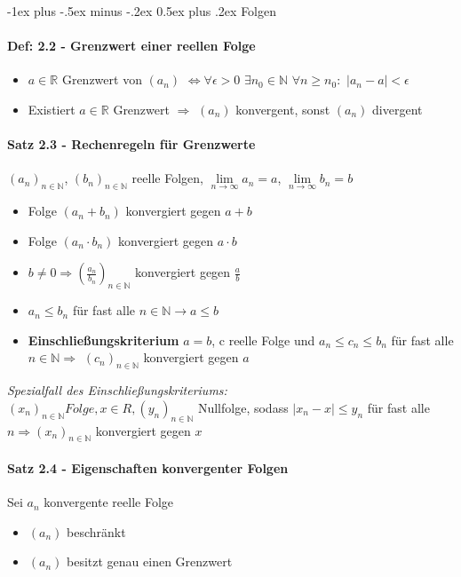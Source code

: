 \documentclass[paper=a4,paper=landscape, fontsize=9pt,DIV=25, twoside]{scrartcl}
\makeatletter
\newcommand{\real}{{\mathbb{R}}}
\newcommand{\nat}{\mathbb{N}}
\renewcommand{\section}{\@startsection{section}{1}{0mm}%
                                {-1ex plus -.5ex minus -.2ex}%
                                {0.5ex plus .2ex}%
                                {\normalfont\large\bfseries}}
\makeatother
\begin{document}
\begin{multicols*}{4}


	\section{Folgen}
		\paragraph{Def: 2.2 - Grenzwert einer reellen Folge}
			\begin{itemize}[noitemsep,nolistsep]
				\item $a \in \real$ Grenzwert von $(a_n)$ $\Leftrightarrow \forall \epsilon > 0$ $\exists n_0 \in \nat$ $\forall n \geq n_0:$ $|a_n - a| < \epsilon$
				\item Existiert $a \in \real$ Grenzwert $\Rightarrow$ $(a_n)$ konvergent, sonst $(a_n)$ divergent
			\end{itemize}
		\paragraph{Satz 2.3 - Rechenregeln für Grenzwerte}
			$(a_n)_{n \in \nat}$, $(b_n)_{n \in \nat}$ reelle Folgen, $\lim\limits_{n \rightarrow \infty} a_n = a$, $\lim\limits_{n \rightarrow \infty} b_n = b$
			\begin{itemize}[noitemsep,nolistsep]
				\item Folge $(a_n + b_n)$ konvergiert gegen $a+b$
				\item Folge $(a_n \cdot b_n)$ konvergiert gegen $a \cdot b$
				\item $b \neq 0 \Rightarrow (\frac{a_n}{b_n})_{n \in \nat}$ konvergiert gegen $\frac{a}{b}$ 
				\item $a_n \leq b_n$ für fast alle $n \in \nat \rightarrow a \leq b$
				\item \textbf{Einschließungskriterium} $a=b$, c reelle Folge und $a_n \leq c_n \leq b_n$ für fast alle $n \in \nat \Rightarrow$ $(c_n)_{n \in \nat}$ konvergiert gegen $a$
			\end{itemize}
		\textit{Spezialfall des Einschließungskriteriums:}\\$(x_n)_{n \in \nat} Folge, x \in R, (y_n)_{n \in \nat}$ Nullfolge, sodass $|x_n -x| \leq y_n$ für fast alle $n \Rightarrow (x_n)_{n \in \nat}$ konvergiert gegen $x$
		\paragraph{Satz 2.4 - Eigenschaften konvergenter Folgen}
		Sei $a_n$ konvergente reelle Folge
		\begin{itemize}[noitemsep,nolistsep]
			\item $(a_n)$ beschränkt
			\item $(a_n)$ besitzt genau einen Grenzwert
		\end{itemize}

\end{multicols*}
\end{document}
